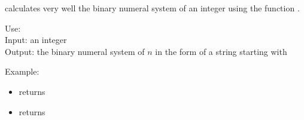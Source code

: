 \documentclass[11pt,class=report,crop=false]{standalone}
\begin{document}
\begin{cours}

\Python{} calculates very well the binary numeral system of an integer using the function .
  
   \begin{fonctionpython}
    Use: \\
    Input: an integer \\
    Output: the binary numeral system of $n$ in the form of a string starting with 
  
  \medskip
     
   Example:
  \begin{itemize}  
    \item {} returns 
    \item {} returns 
  \end{itemize} 
  \end{fonctionpython}  
   
\end{cours}
\end{document}

